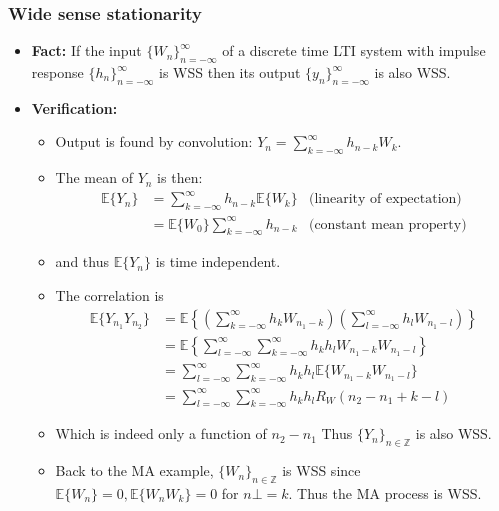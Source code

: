 \documentclass[12pt]{article}
\newcommand{\mexp}{\mathbb{E}}
\newcommand{\mexpproc}[1]{\mathbb{E}\{ #1\}}
\newcommand{\summ}[2]{\sum_{#1}^{#2}}
\newcommand{\arproc}[1]{$\{#1_n \}_{n=-\infty}^{\infty}$}
\begin{document}
\subsubsection{Wide sense stationarity}
\begin{itemize}
    \item \textbf{Fact:} If the input \arproc{W} of a discrete time LTI system with impulse response \arproc{h} is WSS then its output \arproc{y} is also WSS.
    \item \textbf{Verification:}
    \begin{itemize}
        \item Output is found by convolution: $Y_n = \summ{k=-\infty}{\infty}h_{n-k}W_k$. 
        \item The mean of $Y_n$ is then:
        \begin{align*}
          \mexpproc{Y_n} & =  \summ{k=-\infty}{\infty}h_{n-k}\mexpproc{W_k} & \textrm{(linearity of expectation)} \\
          & = \mexpproc{W_0} \summ{k=-\infty}{\infty}h_{n-k} & \textrm{(constant mean property)}
        \end{align*}
        \item and thus $\mexpproc{Y_n}$ is time independent. 
        \item The correlation is 
        \begin{align*}
            \mexpproc{Y_{n_1}Y_{n_2}} & = \mexp\left\{ \left(\summ{k=-\infty}{\infty}h_k  W_{n_1-k} \right) \left(\summ{l=-\infty}{\infty}h_l  W_{n_1-l} \right) \right\} \\
            &= \mexp\left\{ \summ{l=-\infty}{\infty}\summ{k=-\infty}{\infty} h_k h_l  W_{n_1-k} W_{n_1-l}  \right\} \\
            & = \summ{l=-\infty}{\infty}\summ{k=-\infty}{\infty}h_k h_l\mexp\{ W_{n_1-k} W_{n_1-l}\}     \\
            & = \summ{l=-\infty}{\infty}\summ{k=-\infty}{\infty}h_k h_l R_W(n_2-n_1+k-l)
        \end{align*}
        \item Which is indeed only a function of $n_2 -n_1$ Thus $\{ Y_n\}_{n\in \mathbb{Z}}$ is also WSS.
        \item Back to the MA example, $\{ W_n\}_{n\in \mathbb{Z}}$ is WSS since $\mexpproc{W_n}=0, \mexpproc{W_n W_k} =0$ for $n\bot = k$. Thus the MA process is WSS.
    \end{itemize}
\end{itemize}
\end{document}
